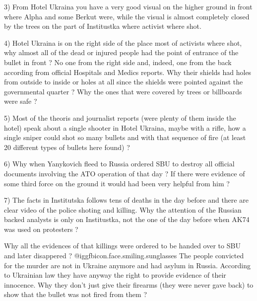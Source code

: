 \begin{itemize}
\begin{itemize}
3) From Hotel Ukraina you have a very good visual on the higher ground in front
where Alpha and some Berkut were, while the visual is almost completely closed
by the trees on the part of Institustka where activist where shot. 

4) Hotel Ukraina is on the right side of the place most of activists where
shot, why almost all of the dead or injured people had the point of entrance of
the bullet in front ? No one from the right side and, indeed, one from the back
according from official Hospitals and Medics reports. Why their shields had
holes from outside to inside or holes at all since the shields were pointed
against the governmental quarter ? Why the ones that were covered by trees or
billboards were safe ? 

5) Most of the theoris and journalist reports (were plenty of them inside the
hotel) speak about a single shooter in Hotel Ukraina, maybe with a rifle, how a
single sniper could shot so many bullets and with that sequence of fire (at
least 20 different types of bullets here found) ? 

6) Why when Yanykovich fleed to Russia ordered SBU to destroy all official
documents involving the ATO operation of that day ? If there were evidence of
some third force on the ground it would had been very helpful from him ? 

7) The facts in Institutska follows tens of deaths in the day before and there
are clear video of the police shoting and killing. Why the attention of the
Russian backed analysts is only on Institustka, not the one of the day before
when AK74 was used on protesters ?

Why all the evidences of that killings were ordered to be handed over to SBU
and later disappered ?  @igg{fbicon.face.smiling.sunglasses}  The people convicted for the murder are not in
Ukraine anymore and had asylum in Russia. According to Ukrainian law they have
anyway the right to provide evidence of their innocence. Why they don't just
give their firearms (they were never gave back) to show that the bullet was not
fired from them ? 


\end{itemize}
\end{itemize}
